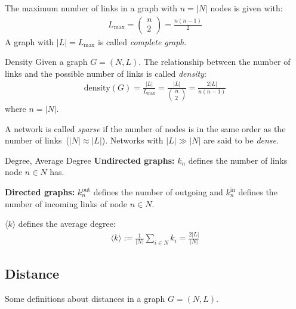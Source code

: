 \documentclass[english]{panikzettel}
\begin{document}
The maximum number of links in a graph with $ n = |N| $ nodes is given with: \label{sec:max_number_links}
\begin{align*}
	L_\text{max} = \left(\begin{array}{c}
	n\\ 2
	\end{array}\right) = \frac{n (n-1)}{2}
\end{align*}
A graph with $ |L| = L_\text{max} $ is called \emph{complete graph}.

\begin{halfboxl}
	\vspace{-\baselineskip}
	\begin{defi}{Density}
		Given a graph $ G = (N,L) $.
		The relationship between the number of links and the possible number of links is called \textit{density}:
		\begin{align*}
		\text{density}(G) = \frac{|L|}{L_\text{max}} = \frac{|L|}{\left(\begin{array}{c}
			n\\ 2
			\end{array}\right)} = \frac{2 |L|}{n (n-1)}
		\end{align*}
		where $ n = |N| $.

		A network is called \textit{sparse} if the number of nodes is in the same order as the number of links~($ |N| \approx |L| $).
		Networks with $ |L| \gg |N| $ are said to be \textit{dense}.
	\end{defi}
\end{halfboxl}%
\begin{halfboxr}
	\vspace{-\baselineskip}
	\begin{defi}{Degree, Average Degree}
		\textbf{Undirected graphs:} $ k_n $ defines the number of links node $ n \in N $ has.

		\textbf{Directed graphs:} $ k^\text{out}_n $ defines the number of outgoing and $ k^\text{in}_n $ defines the number of incoming links of node $ n \in N $.

		$ \langle k \rangle $ defines the average degree:
		\begin{align*}
			\langle k \rangle := \frac{1}{|N|} \sum\limits_{i \in N} k_i = \frac{2 |L|}{|N|}
		\end{align*}
	\end{defi}
\end{halfboxr}

\subsection{Distance}\label{sec:distance}
Some definitions about distances in a graph $ G = (N,L) $.
\end{document}
